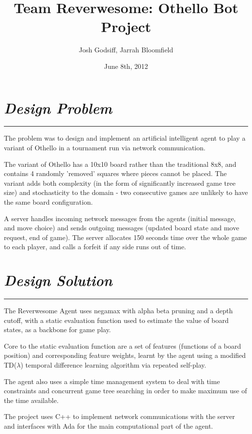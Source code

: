 \documentclass[10pt]{report}
\begin{document}
\date{June 8th, 2012}
\title{Team Reverwesome: Othello Bot Project}
\author{Josh Godsiff, Jarrah Bloomfield}
\maketitle

\setlength{\columnsep}{22.0pt}
\begin{multicols}{2}
\section*{\emph{Design Problem}}
\hrule

The problem was to design and implement an artificial intelligent agent to play a variant of Othello in a tournament run via network communication.

The variant of Othello has a 10x10 board rather than the traditional 8x8, and contains 4 randomly 'removed' squares where pieces cannot be placed. The variant adds both complexity (in the form of significantly increased game tree size) and stochasticity to the domain - two consecutive games are unlikely to have the same board configuration.

A server handles incoming network messages from the agents (initial message, and move choice) and sends outgoing messages (updated board state and move request, end of game). The server allocates 150 seconds time over the whole game to each player, and calls a forfeit if any side runs out of time.
\section*{\emph{Design Solution}}
\hrule

The Reverwesome Agent uses negamax with alpha beta pruning and a depth cutoff, with a static evaluation function used to estimate the value of board states, as a backbone for game play.

Core to the static evaluation function are a set of features (functions of a board position) and corresponding feature weights, learnt by the agent using a modified TD($\lambda$) temporal difference learning algorithm via repeated self-play.

The agent also uses a simple time management system to deal with time constraints and concurrent game tree searching in order to make maximum use of the time available.

The project uses C++ to implement network communications with the server and interfaces with Ada for the main computational part of the agent.

\end{multicols}
\end{document}
